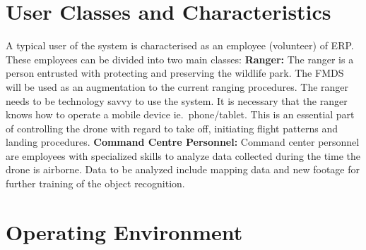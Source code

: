 \section{User Classes and Characteristics}

\begin{flushleft}
	A typical user of the system is characterised as an employee (volunteer) of ERP. 
	These employees can be divided into two main classes:
	\newline
	\newline
	\textbf{Ranger:}
	\newline
	The ranger is a person entrusted with protecting and preserving the wildlife park. 
	The FMDS will be used as an augmentation to the current ranging procedures. 
	The ranger needs to be technology savvy to use the system.
	It is necessary that the ranger knows how to operate a mobile device ie.\ phone/tablet.
	This is an essential part of controlling the drone with regard to take off, initiating flight patterns and landing procedures.
	\newline
	\newline
	\textbf{Command Centre Personnel:}
	\newline
	Command center personnel are employees with specialized skills to analyze data collected during the time the drone is airborne. 
	Data to be analyzed include mapping data and new footage for further training of the object recognition.
	
	
\end{flushleft}

\section{Operating Environment}


